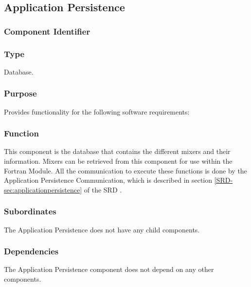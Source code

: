 \subsection{Application Persistence}
\label{subsec:apppersistence}

\subsubsection*{Component Identifier}
\RTMSAP{}

\subsubsection*{Type}
Database.

\subsubsection*{Purpose}
Provides functionality for the following software requirements:

\noindent {}

\subsubsection*{Function}
This component is the database that contains the different mixers and their information. Mixers can be retrieved from this component for use within the Fortran Module. All the communication to execute these functions is done by the Application Persistence Communication, which is described in section \ref*{SRD-sec:applicationpersistence} of the SRD \cite{srd}.

\subsubsection*{Subordinates}
The Application Persistence does not have any child components.

\subsubsection*{Dependencies}
The Application Persistence component does not depend on any other components.


